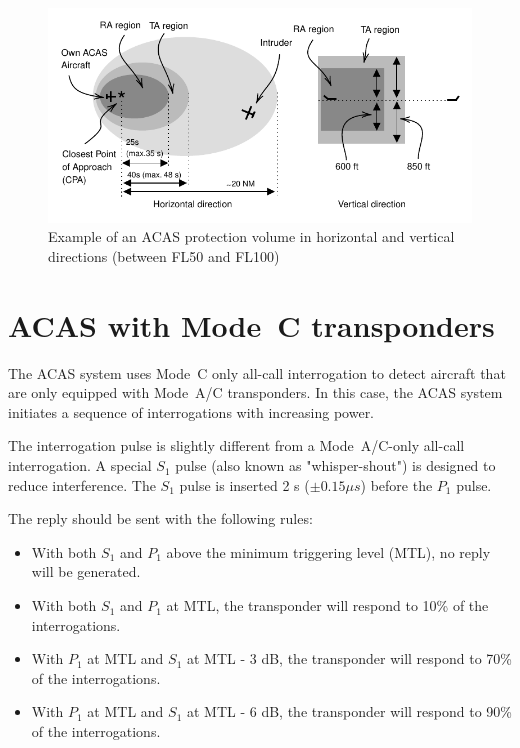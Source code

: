 \begin{figure}[ht]
\centering
\includegraphics[scale=0.9]{figures/mode_s/acas_regions.pdf}
\caption{Example of an ACAS protection volume in horizontal and vertical directions (between FL50 and FL100)}
\label{fig:acas_regions}
\end{figure}




\section{ACAS with Mode~C transponders}

The ACAS system uses Mode~C only all-call interrogation to detect aircraft that are only equipped with Mode~A/C transponders. In this case, the ACAS system initiates a sequence of interrogations with increasing power.

The interrogation pulse is slightly different from a Mode~A/C-only all-call interrogation. A special $S_1$ pulse (also known as "whisper-shout") is designed to reduce interference. The $S_1$ pulse is inserted 2  {\textmu}s ($\pm 0.15 \mu s$) before the $P_1$ pulse.

The reply should be sent with the following rules:

\begin{itemize}
  \item With both $S_1$ and $P_1$ above the minimum triggering level (MTL), no reply will be generated.
  \item With both $S_1$ and $P_1$ at MTL, the transponder will respond to 10\% of the interrogations.
  \item With $P_1$ at MTL and $S_1$ at MTL - 3 dB, the transponder will respond to 70\% of the interrogations.
  \item With $P_1$ at MTL and $S_1$ at MTL - 6 dB, the transponder will respond to 90\% of the interrogations.
\end{itemize}


